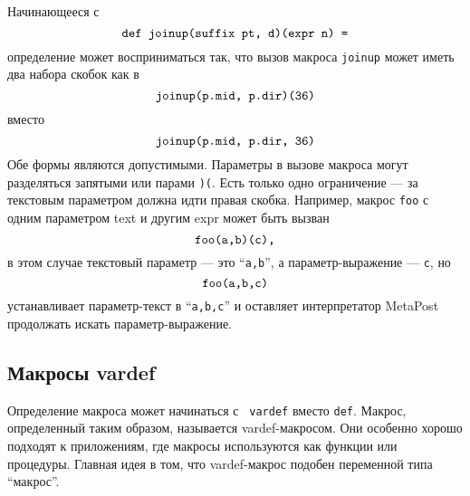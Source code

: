 \documentclass{article} %
\begin{document}
Начинающееся с 
$$ \hbox{\tt def joinup(suffix pt, d)(expr n) =} $$
определение может восприниматься так, что вызов макроса {\tt joinup} может 
иметь два набора скобок как в 
$$ \hbox{\tt joinup(p.mid, p.dir)(36)} $$
вместо
$$ \hbox{\tt joinup(p.mid, p.dir, 36)} $$
Обе формы являются допустимыми.
Параметры в вызове макроса могут разделяться запятыми или парами {\tt )(}.
Есть только одно ограничение --- за текстовым параметром 
должна идти правая скобка.
Например, макрос {\tt foo} с одним параметром text и другим expr может 
быть вызван 
$$ \hbox{\tt foo(a,b)(c),} $$
в этом случае текстовый параметр --- это ``{\tt a,b}'', а параметр-выражение 
--- {\tt c}, но 
$$ \hbox{\tt foo(a,b,c)} $$
устанавливает параметр-текст в ``{\tt a,b,c}'' и оставляет интерпретатор 
MetaPost продолжать искать параметр-выражение.

\subsection{Макросы vardef}

Определение макроса может начинаться с {\tt
vardef} вместо {\tt def}. 
Макрос, определенный таким образом, называется vardef-макросом. 
Они особенно хорошо подходят к приложениям, где макросы используются 
как функции или процедуры.
Главная идея в том, что vardef-макрос подобен переменной типа ``макрос''.
\end{document}

